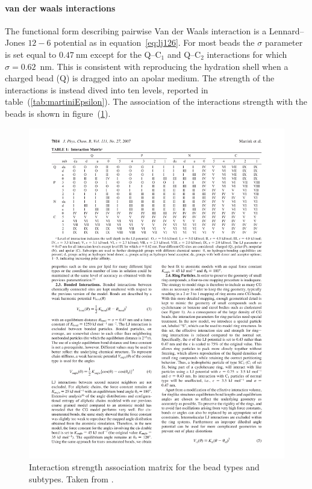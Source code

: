 \paragraph{\textbf{van der waals interactions}} The functional form describing pairwise Van der Waals interaction is a Lennard--Jones $12-6$ potential as in equation~\eqref{eq:lj126}.
For most beads the $\sigma$ parameter is set equal to $0.47~$nm except for the Q--C$_1$ and Q--C$_2$ interactions for which $\sigma = 0.62$~nm. This is consistent with reproducing the hydration shell when a charged bead (Q) is dragged into an apolar medium. The strength of the interactions is instead dived into ten levels, reported in table~(\ref{tab:martiniEpsilon}). The association of the interactions strength with the \martini beads is shown in figure~(\ref{fig:martiniInteractions}).
\begin{figure}[h!t]%
	\center
	\includegraphics[width=\textwidth]{img/martiniInteractions.pdf}%
	\caption{Interaction strength association matrix for the \martini bead types and subtypes. Taken from \cite{Martini}.}
	\label{fig:martiniInteractions}
\end{figure}

